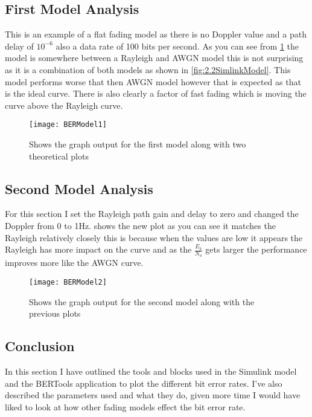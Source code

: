 {	\subsection{First Model Analysis}
	{
		This is an example of a flat fading model as there is no Doppler value and a path delay of $10^{-6}$ also a data rate of 100 bits per second. As you can see from \cref{fig:BERModel1} the model is somewhere between a Rayleigh and AWGN model this is not surprising as it is a combination of both models as shown in \cref{fig:2.2SimlinkModel}. This model performs worse that then AWGN model however that is expected as that is the ideal curve. There is also clearly a factor of fast fading which is moving the curve above the Rayleigh curve.
   		\begin{figure}
			\centering
			\texttt{[image: BERModel1]}
			\caption{Shows the graph output for the first model along with two theoretical plots}
			\label{fig:BERModel1}
		\end{figure}
	}
	\subsection{Second Model Analysis}
	{
		For this section I set the Rayleigh path gain and delay to zero and changed the Doppler from 0 to 1Hz.  shows the new plot as you can see it matches the Rayleigh relatively closely this is because when the values are low it appears the Rayleigh has more impact on the curve and as the $\frac{E_b}{N_o}$ gets larger the performance improves more like the AWGN curve.
   		\begin{figure}
			\centering
			\texttt{[image: BERModel2]}
			\caption{Shows the graph output for the second model along with the previous plots}
			\label{fig:BERModel2}
		\end{figure}
	}
	\subsection{Conclusion}
	{
		In this section I have outlined the tools and blocks used in the Simulink model and the BERTools application to plot the different bit error rates. I've also described the parameters used and what they do, given more time I would have liked to look at how other fading models effect the bit error rate. 
	}

}